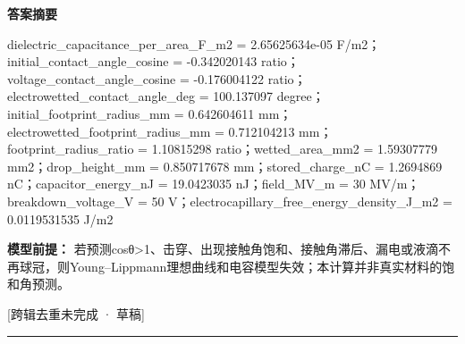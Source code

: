\documentclass[UTF8,11pt,a4paper]{ctexart}
\begin{document}
\noindent\textbf{答案摘要}\par
dielectric\_capacitance\_per\_area\_F\_m2 = 2.65625634e-05 F/m2；initial\_contact\_angle\_cosine = -0.342020143 ratio；voltage\_contact\_angle\_cosine = -0.176004122 ratio；electrowetted\_contact\_angle\_deg = 100.137097 degree；initial\_footprint\_radius\_mm = 0.642604611 mm；electrowetted\_footprint\_radius\_mm = 0.712104213 mm；footprint\_radius\_ratio = 1.10815298 ratio；wetted\_area\_mm2 = 1.59307779 mm2；drop\_height\_mm = 0.850717678 mm；stored\_charge\_nC = 1.2694869 nC；capacitor\_energy\_nJ = 19.0423035 nJ；field\_MV\_m = 30 MV/m；breakdown\_voltage\_V = 50 V；electrocapillary\_free\_energy\_density\_J\_m2 = 0.0119531535 J/m2\par
\noindent\textbf{模型前提：}
若预测cosθ>1、击穿、出现接触角饱和、接触角滞后、漏电或液滴不再球冠，则Young–Lippmann理想曲线和电容模型失效；本计算并非真实材料的饱和角预测。\par
\noindent\textcolor{red!65!black}{[跨辑去重未完成 · 草稿]} \par
\medskip\hrule\medskip
{}
\end{document}
